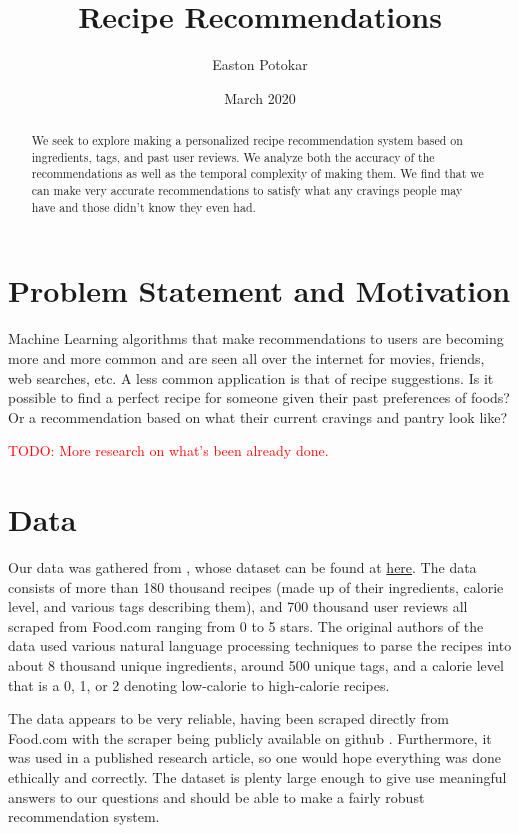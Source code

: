 \documentclass[11pt]{article}
\title{Recipe Recommendations}
\author{Easton Potokar}
\date{March 2020}
\newcommand\todo[1]{\textcolor{red}{TODO: #1 \\}}
\begin{document}
\maketitle

\begin{abstract}
    We seek to explore making a personalized recipe recommendation system based on ingredients, tags, and past user reviews. We analyze both the accuracy of the recommendations as well as the temporal complexity of making them. We find that we can make very accurate recommendations to satisfy what any cravings people may have and those didn't know they even had.
\end{abstract}

\section{Problem Statement and Motivation}
Machine Learning algorithms that make recommendations to users are becoming more and more common and are seen all over the internet for movies, friends, web searches, etc. A less common application is that of recipe suggestions. Is it possible to find a perfect recipe for someone given their past preferences of foods? Or a recommendation based on what their current cravings and pantry look like? 

\todo{More research on what's been already done.}

\section{Data}
Our data was gathered from \cite{data}, whose dataset can be found at \href{https://www.kaggle.com/shuyangli94/food-com-recipes-and-user-interactions}{here}. The data consists of more than 180 thousand recipes (made up of their ingredients, calorie level, and various tags describing them), and 700 thousand user reviews all scraped from Food.com ranging from 0 to 5 stars. The original authors of the data used various natural language processing techniques to parse the recipes into about 8 thousand unique ingredients, around 500 unique tags, and a calorie level that is a 0, 1, or 2 denoting low-calorie to high-calorie recipes.

The data appears to be very reliable, having been scraped directly from Food.com with the scraper being publicly available on github \cite{data_scraper}. Furthermore, it was used in a published research article, so one would hope everything was done ethically and correctly. The dataset is plenty large enough to give use meaningful answers to our questions and should be able to make a fairly robust recommendation system.
\end{document}
